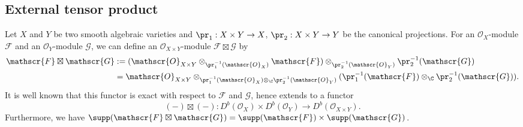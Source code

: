 \subsection{External tensor product}
Let $X$ and $Y$ be two smooth algebraic varieties and $\pr_1:X\times Y\to X$, $\pr_2:X\times Y\to Y$ be the canonical projections. For an $\mathscr{O}_X$-module $\mathscr{F}$ and an $\mathscr{O}_Y$-module $\mathscr{G}$, we can define an $\mathscr{O}_{X\times Y}$-module $\mathscr{F}\boxtimes\mathscr{G}$ by
\begin{align*}
\mathscr{F}\boxtimes\mathscr{G}&:=(\mathscr{O}_{X\times Y}\otimes_{\pr_1^{-1}(\mathscr{O}_X)}\mathscr{F})\otimes_{\pr_2^{-1}(\mathscr{O}_Y)}\pr_2^{-1}(\mathscr{G})\\
&=\mathscr{O}_{X\times Y}\otimes_{\pr_1^{-1}(\mathscr{O}_X)\otimes_\C \pr_2^{-1}(\mathscr{O}_Y)}(\pr_1^{-1}(\mathscr{F})\otimes_{\C}\pr_2^{-1}(\mathscr{G})).
\end{align*}
It is well known that this functor is exact with respect to $\mathscr{F}$ and $\mathscr{G}$, hence extends to a functor
\[(-)\boxtimes(-):D^b(\mathscr{O}_X)\times D^b(\mathscr{O}_Y)\to D^b(\mathscr{O}_{X\times Y}).\]
Furthermore, we have $\supp(\mathscr{F}\boxtimes\mathscr{G})=\supp(\mathscr{F})\times\supp(\mathscr{G})$.\par

